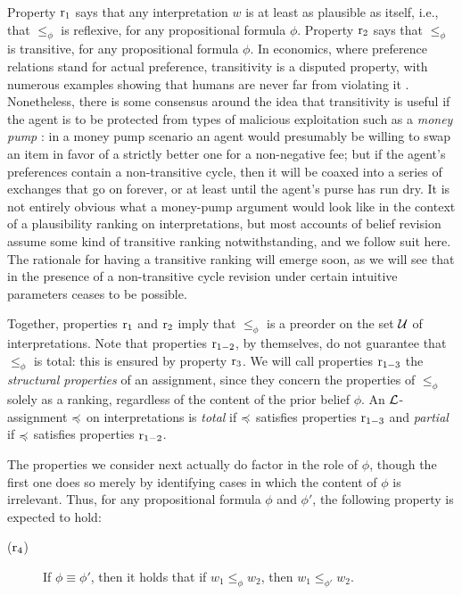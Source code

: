 Property $\mathrm{r}_{1}$ says that any interpretation $w$ is at least as plausible as itself,
i.e., that $\le_{\phi}$ is reflexive, for any propositional formula $\phi$.
Property $\mathrm{r}_{2}$ says that $\le_{\phi}$ is transitive, 
for any propositional formula $\phi$.
In economics, where preference relations stand for actual preference,
transitivity is a disputed property, with numerous examples showing that 
humans are never far from violating it \cite{Luce56,Quinn90,Bar-HillelM88}.
Nonetheless, there is some consensus around the idea that transitivity is 
useful if the agent is to be protected from types of malicious exploitation
such as a \emph{money pump} \cite{Anand09,HanssonGY18}:
in a money pump scenario an agent would presumably be willing to swap an item in favor 
of a strictly better one for a non-negative fee; but if the agent's preferences
contain a non-transitive cycle, then it will be coaxed into a 
series of exchanges that go on forever, 
or at least until the agent's purse has run dry.
It is not entirely obvious what a money-pump argument would look like in 
the context of a plausibility ranking on interpretations,
but most accounts of belief revision assume some kind of 
transitive ranking notwithstanding, and we follow suit here.
The rationale for having a transitive ranking will emerge soon,
as we will see that in the presence of a non-transitive cycle
revision under certain intuitive parameters ceases to be possible.

Together, properties $\mathrm{r}_{1}$ and $\mathrm{r}_{2}$ imply that $\le_{\phi}$
is a preorder on the set $\mathcal{U}$ of interpretations.
Note that properties $\mathrm{r}_{1-2}$, by themselves, do not guarantee
that $\le_{\phi}$ is total:
this is ensured by property $\mathrm{r}_{3}$.
We will call properties $\mathrm{r}_{1-3}$ the \emph{structural properties} of 
an assignment, since they concern the properties of $\le_{\phi}$ solely 
as a ranking, regardless of the content of the prior belief $\phi$.
An $\mathcal{L}$-assignment $\preccurlyeq$ on interpretations is 
\emph{total} if $\preccurlyeq$ satisfies properties $\mathrm{r}_{1-3}$
and
\emph{partial} if $\preccurlyeq$ satisfies properties $\mathrm{r}_{1-2}$.

The properties we consider next actually do factor in the role of $\phi$, 
though the first one does so merely by identifying cases in which 
the content of $\phi$ is irrelevant.
Thus, for any propositional formula $\phi$ and $\phi'$, 
the following property is expected to hold:
\begin{description}
	\item[($\mathrm{r}_{4}$)] If $\phi\equiv\phi'$, then it holds that if $w_1\le_\phi w_2$, then $w_1\le_{\phi'}w_2$.	
\end{description}

